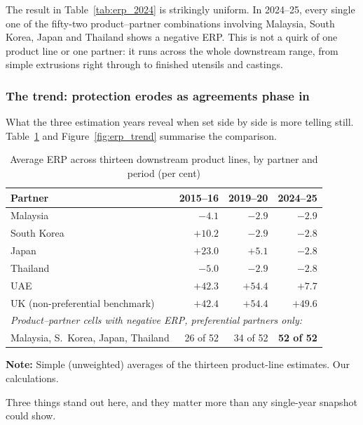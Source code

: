 \documentclass[11pt, a4paper]{article}
\numberwithin{figure}{section}
\numberwithin{table}{section}
\begin{document}
The result in Table~\ref{tab:erp_2024} is strikingly uniform. In 2024--25, every single one of the fifty-two product--partner combinations involving Malaysia, South Korea, Japan and Thailand shows a negative ERP. This is not a quirk of one product line or one partner: it runs across the whole downstream range, from simple extrusions right through to finished utensils and castings.

\subsubsection*{The trend: protection erodes as agreements phase in}
What the three estimation years reveal when set side by side is more telling still. Table~\ref{tab:erp_trend} and Figure~\ref{fig:erp_trend} summarise the comparison.

\begin{table}[H]
    \centering
    \caption{Average ERP across thirteen downstream product lines, by partner and period (per cent)}
    \label{tab:erp_trend}
    \begin{tabular}{lrrr}
        \toprule
        \textbf{Partner} & \textbf{2015--16} & \textbf{2019--20} & \textbf{2024--25} \\
        \midrule
        Malaysia & $-4.1$ & $-2.9$ & $-2.9$ \\
        South Korea & $+10.2$ & $-2.9$ & $-2.8$ \\
        Japan & $+23.0$ & $+5.1$ & $-2.8$ \\
        Thailand & $-5.0$ & $-2.9$ & $-2.8$ \\
        UAE & $+42.3$ & $+54.4$ & $+7.7$ \\
        UK (non-preferential benchmark) & $+42.4$ & $+54.4$ & $+49.6$ \\
        \midrule
        \multicolumn{4}{l}{\textit{Product--partner cells with negative ERP, preferential partners only:}} \\
        Malaysia, S.~Korea, Japan, Thailand & 26 of 52 & 34 of 52 & \textbf{52 of 52} \\
        \bottomrule
    \end{tabular}

    \vspace{0.2cm}
    \raggedright
    \small \textbf{Note:} Simple (unweighted) averages of the thirteen product-line estimates. Our calculations.
\end{table}

Three things stand out here, and they matter more than any single-year snapshot could show.
\end{document}

